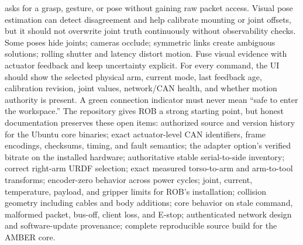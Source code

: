  asks for a grasp, gesture, or pose without gaining raw packet access.\markdownRendererOlItemEnd 
\markdownRendererOlEnd \markdownRendererInterblockSeparator
{}Visual pose estimation can detect disagreement and help calibrate mounting or joint offsets, but it should not overwrite joint truth continuously without observability checks. Some poses hide joints; cameras occlude; symmetric links create ambiguous solutions; rolling shutter and latency distort motion. Fuse visual evidence with actuator feedback and keep uncertainty explicit.\markdownRendererParagraphSeparator
{}For every command, the UI should show the selected physical arm, current mode, last feedback age, calibration revision, joint values, network/CAN health, and whether motion authority is present. A green connection indicator must never mean “safe to enter the workspace.”\markdownRendererInterblockSeparator
{}
\markdownRendererSectionEnd \markdownRendererSectionBegin
{}\markdownRendererInterblockSeparator
{}The repository gives ROB a strong starting point, but honest documentation preserves these open items:\markdownRendererInterblockSeparator
{}\markdownRendererUlBegin
\markdownRendererUlItem authorized source and version history for the Ubuntu core binaries;\markdownRendererUlItemEnd 
\markdownRendererUlItem exact actuator-level CAN identifiers, frame encodings, checksums, timing, and fault semantics;\markdownRendererUlItemEnd 
\markdownRendererUlItem the adapter option's verified bitrate on the installed hardware;\markdownRendererUlItemEnd 
\markdownRendererUlItem authoritative stable serial-to-side inventory;\markdownRendererUlItemEnd 
\markdownRendererUlItem correct right-arm URDF selection;\markdownRendererUlItemEnd 
\markdownRendererUlItem exact measured torso-to-arm and arm-to-tool transforms;\markdownRendererUlItemEnd 
\markdownRendererUlItem encoder-zero behavior across power cycles;\markdownRendererUlItemEnd 
\markdownRendererUlItem joint, current, temperature, payload, and gripper limits for ROB's installation;\markdownRendererUlItemEnd 
\markdownRendererUlItem collision geometry including cables and body additions;\markdownRendererUlItemEnd 
\markdownRendererUlItem core behavior on stale command, malformed packet, bus-off, client loss, and E-stop;\markdownRendererUlItemEnd 
\markdownRendererUlItem authenticated network design and software-update provenance;\markdownRendererUlItemEnd 
\markdownRendererUlItem complete reproducible source build for the AMBER core.\markdownRendererUlItemEnd 
